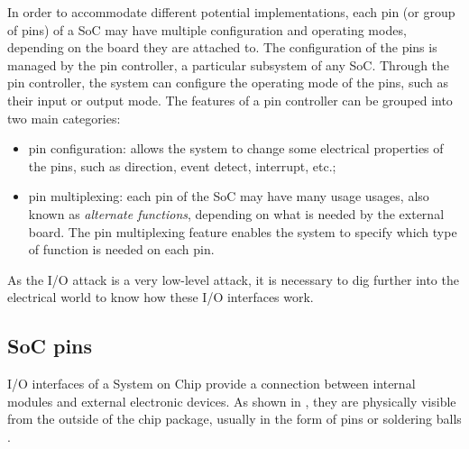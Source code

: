 In order to accommodate different potential implementations, each pin (or group of pins) of a SoC may have multiple configuration and operating modes,
depending on the board they are attached to. The configuration of the pins is managed by the pin controller, a particular subsystem of any SoC.
Through the pin controller, the system can configure the operating mode of the pins, such as their input or output mode.
The features of a pin controller can be grouped into two main categories:
\begin{itemize}
	\item pin configuration: allows the system to change some electrical properties of the pins, such as direction, event detect, interrupt, etc.;
	\item pin multiplexing: each pin of the SoC may have many usage usages, also known as \emph{alternate functions}, depending on what is needed by the external board.
		The pin multiplexing feature enables the system to specify which type of function is needed on each pin.
\end{itemize}
As the I/O attack is a very low-level attack, it is necessary to dig further into the electrical world to know how these I/O interfaces work.


\subsection{SoC pins}
\label{sec:iopins}

I/O interfaces of a System on Chip provide a connection between internal modules and external electronic devices.
As shown in \myfig{\ref{fig:chips}}, they are physically visible from the outside of the chip package,
usually in the form of pins  or soldering balls .

